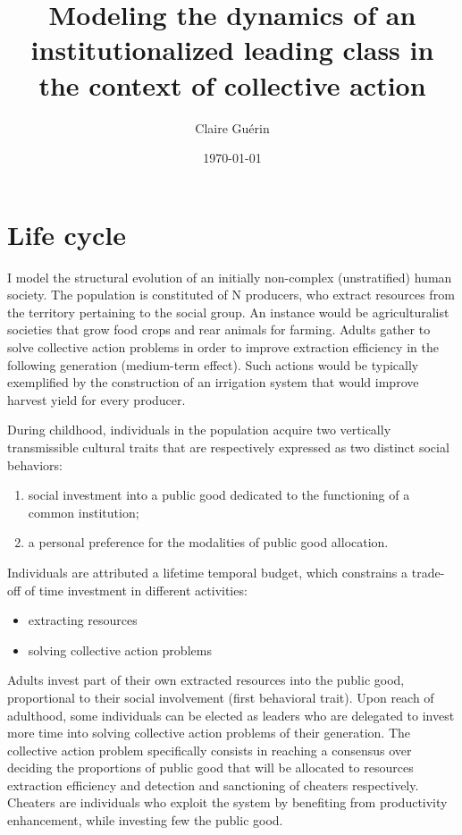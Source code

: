 \documentclass[a4paper]{article}
\title{Modeling the dynamics of an institutionalized leading class in the context of collective action}
\author{Claire Gu\'{e}rin}
\date{\today}
\begin{document}
\maketitle

\section{Life cycle}
\label{sec:lifcyc}

I model the structural evolution of an initially non-complex (unstratified) human society. The population is constituted of N producers, who extract resources from the territory pertaining to the social group. An instance would be agriculturalist societies that grow food crops and rear animals for farming. Adults gather to solve collective action problems in order to improve extraction efficiency in the following generation (medium-term effect). Such actions would be typically exemplified by the construction of an irrigation system that would improve harvest yield for every producer. 

During childhood, individuals in the population acquire two vertically transmissible cultural traits that are respectively expressed as two distinct social behaviors:

\begin{enumerate}
	\item social investment into a public good dedicated to the functioning of a common institution;
	\item a personal preference for the modalities of public good allocation.
\end{enumerate} 

Individuals are attributed a lifetime temporal budget, which constrains a trade-off of time investment in different activities:

\begin{itemize}
	\item extracting resources
	\item solving collective action problems
\end{itemize}
	
Adults invest part of their own extracted resources into the public good, proportional to their social involvement (first behavioral trait). 
Upon reach of adulthood, some individuals can be elected as leaders who are delegated to invest more time into solving collective action problems of their generation. The collective action problem specifically consists in reaching a consensus over deciding the proportions of public good that will be allocated to resources extraction efficiency and detection and sanctioning of cheaters respectively. Cheaters are individuals who exploit the system by benefiting from productivity enhancement, while investing few the public good.  
\end{document}
